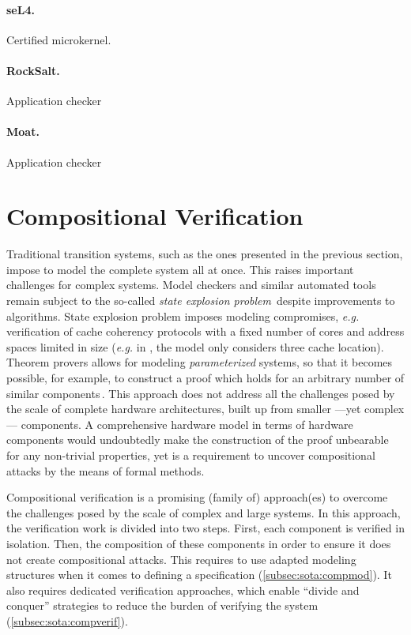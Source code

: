 \paragraph{seL4.}
%
Certified microkernel.

\paragraph{RockSalt.}
%
Application checker

\paragraph{Moat.}
%
Application checker

\section{Compositional Verification}
\label{section:sota:compsec}

Traditional transition systems, such as the ones presented in the previous
section, impose to model the complete system all at once.
%
This raises important challenges for complex systems.
%
Model checkers and similar automated tools remain subject to the so-called
\emph{state explosion problem}\,\cite{clarke2012model} despite improvements to
algorithms.
%
State explosion problem imposes modeling compromises, \emph{e.g.}  verification
of cache coherency protocols with a fixed number of cores and address spaces
limited in size (\emph{e.g.} in \cite{lie2003xom}, the model only considers
three cache location).
%
Theorem provers allows for modeling \emph{parameterized} systems, so that it
becomes possible, for example, to construct a proof which holds for an arbitrary
number of similar components\,\cite{vijayaraghavan2015modular}.
%
This approach does not address all the challenges posed by the scale of complete
hardware architectures, built up from smaller ---yet complex--- components.
%
A comprehensive hardware model in terms of hardware components would undoubtedly
make the construction of the proof unbearable for any non-trivial properties,
yet is a requirement to uncover compositional attacks by the means of formal
methods.

Compositional verification is a promising (family of) approach(es) to overcome
the challenges posed by the scale of complex and large systems.
%
In this approach, the verification work is divided into two steps.
%
First, each component is verified in isolation.
%
Then, the composition of these components in order to ensure it does not create
compositional attacks.
%
This requires to use adapted modeling structures when it comes to defining a
specification (\ref{subsec:sota:compmod}).
%
It also requires dedicated verification approaches, which enable ``divide and
conquer'' strategies to reduce the burden of verifying the system
(\ref{subsec:sota:compverif}).

